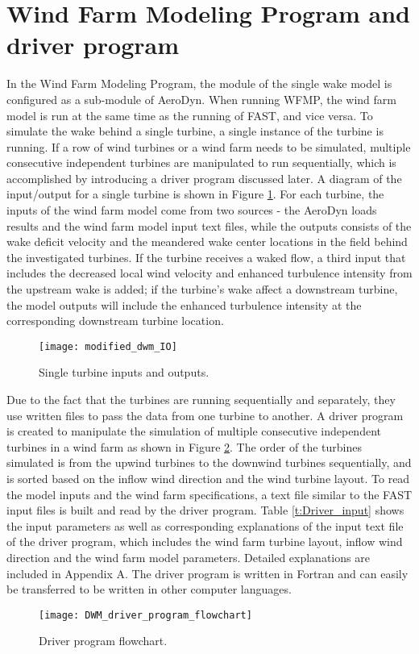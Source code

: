 \documentclass{umthesis}
\begin{document}
\section{Wind Farm Modeling Program and driver program}\label{sec:DWM_FAST}
In the Wind Farm Modeling Program, the module of the single wake model is configured as a sub-module of AeroDyn. When running WFMP, the wind farm model is run at the same time as the running of FAST, and vice versa. To simulate the wake behind a single turbine, a single instance of the turbine is running. If a row of wind turbines or a wind farm needs to be simulated, multiple consecutive independent turbines are manipulated to run sequentially, which is accomplished by introducing a driver program discussed later. A diagram of the input/output for a single turbine is shown in Figure \ref{fig:DWM_IO}. For each turbine, the inputs of the wind farm model come from two sources - the AeroDyn loads results and the wind farm model input text files, while the outputs consists of the wake deficit velocity and the meandered wake center locations in the field behind the investigated turbines. If the turbine receives a waked flow, a third input that includes the decreased local wind velocity and enhanced turbulence intensity from the upstream wake is added; if the turbine's wake affect a downstream turbine, the model outputs will include the enhanced turbulence intensity at the corresponding downstream turbine location.
\begin{figure}
  \centering
  \texttt{[image: modified\_dwm\_IO]}
  \caption{Single turbine inputs and outputs.}\label{fig:DWM_IO}
\end{figure}

Due to the fact that the turbines are running sequentially and separately, they use written files to pass the data from one turbine to another. A driver program is created to manipulate the simulation of multiple consecutive independent turbines in a wind farm as shown in Figure \ref{fig:driver program flowchart}. The order of the turbines simulated is from the upwind turbines to the downwind turbines sequentially, and is sorted based on the inflow wind direction and the wind turbine layout. To read the model inputs and the wind farm specifications, a text file similar to the FAST input files is built and read by the driver program. Table \ref{t:Driver_input} shows the input parameters as well as corresponding explanations of the input text file of the driver program, which includes the wind farm turbine layout, inflow wind direction and the wind farm model parameters. Detailed explanations are included in Appendix A. The driver program is written in Fortran and can easily be transferred to be written in other computer languages.
\begin{figure}
  \centering
  \texttt{[image: DWM\_driver\_program\_flowchart]}
  \caption{Driver program flowchart.}\label{fig:driver program flowchart}
\end{figure}
\end{document}
